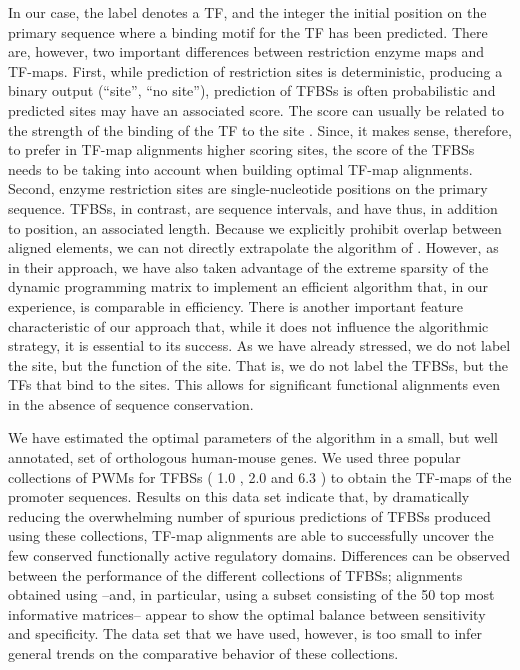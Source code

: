 In our case, the label denotes a TF, and the integer the initial
position on the primary sequence where a binding motif for the TF has
been predicted. There are, however, two important differences between
restriction enzyme maps and TF-maps. First, while prediction of
restriction sites is deterministic, producing a binary output
(``site'', ``no site''), prediction of TFBSs is often probabilistic
and predicted sites may have an associated score. The score can
usually be related to the strength of the binding of the TF to the
site \citep{stormo:2000a}. Since, it makes sense, therefore, to prefer
in TF-map alignments higher scoring sites, the score of the TFBSs needs
to be taking into account when building optimal TF-map alignments.
Second, enzyme restriction sites are single-nucleotide positions on
the primary sequence. TFBSs, in contrast, are sequence intervals, and
have thus, in addition to position, an associated length. Because we
explicitly prohibit overlap between aligned elements, we can not
directly extrapolate the algorithm of \citet{myers:1992a}. However, as
in their approach, we have also taken advantage of the extreme
sparsity of the dynamic programming matrix to implement an efficient
algorithm that, in our experience, is comparable in efficiency. There
is another important feature characteristic of our approach that,
while it does not influence the algorithmic strategy, it is essential
to its success. As we have already stressed, we do not label the site,
but the function of the site. That is, we do not label the TFBSs, but
the TFs that bind to the sites. This allows for significant functional
alignments even in the absence of sequence conservation.

We have estimated the optimal parameters of the algorithm in a small,
but well annotated, set of orthologous human-mouse genes. We used three
popular collections of PWMs for TFBSs ( 1.0 \citep{sandelin:2004a}, 
 2.0 \citep{farre:2003a} and  6.3 \citep{matys:2003a}) to 
obtain the TF-maps of the promoter sequences. Results on this data set 
indicate that, by dramatically reducing the overwhelming number of 
spurious predictions of TFBSs produced using these collections, 
TF-map alignments are able to successfully uncover the few conserved 
functionally active regulatory domains. 
Differences can be observed between the performance of the
different collections of TFBSs; alignments obtained using   
--and, in particular, using a subset consisting of the 50 top most informative
matrices-- appear to show the optimal balance between sensitivity and
specificity. The data set that we have used, however, is too small to
infer general trends on the comparative behavior of these collections.

